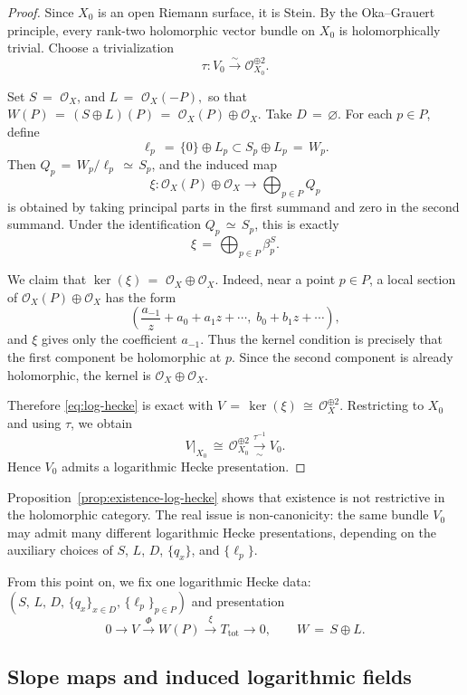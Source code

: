 \documentclass[a4paper,12pt]{amsart}
\numberwithin{equation}{section}
\theoremstyle{definition}
\newcommand{\OO}{\mathcal{O}}
\begin{document}
\begin{proof}
Since \(X_0\) is an open Riemann surface, it is Stein.  By the Oka--Grauert principle, every rank-two holomorphic vector bundle on \(X_0\) is holomorphically trivial.  Choose a trivialization
\[
\tau:V_0\xrightarrow{\sim}\OO_{X_0}^{\oplus 2}.
\]

Set
\(
S\,=\,\,\OO_X\), and  \(L\,=\,\,\OO_X(-P),
\)
so that
\(
W(P)\,=\,(S\oplus L)(P)\,=\,\,\OO_X(P)\oplus \OO_X.
\)
Take \(D\,=\,\varnothing\).  For each \(p\in P\), define
\[
\ell_p\,=\,\{0\}\oplus L_p\subset S_p\oplus L_p\,=\,W_p.
\]
Then \(Q_p\,=\,W_p/\ell_p\,\simeq\, S_p\), and the induced map
\[
\xi:\OO_X(P)\oplus \OO_X\longrightarrow \bigoplus_{p\in P}Q_p
\]
is obtained by taking principal parts in the first summand and zero in the second summand.  Under the identification \(Q_p\,\simeq\, S_p\), this is exactly
\[
\xi\,=\,\bigoplus_{p\in P}\beta_p^S.
\]

We claim that \(\ker(\xi)\,=\,\,\OO_X\oplus \OO_X\).  Indeed, near a point \(p\in P\), a local section of \(\OO_X(P)\oplus \OO_X\) has the form
\[
\left(\frac{a_{-1}}{z}+a_0+a_1z+\cdots,\; b_0+b_1z+\cdots\right),
\]
and \(\xi\) gives only the coefficient \(a_{-1}\).  Thus the kernel condition is precisely that the first component be holomorphic at \(p\).  Since the second component is already holomorphic, the kernel is \(\OO_X\oplus \OO_X\).

Therefore \eqref{eq:log-hecke} is exact with \(V\,=\,\ker(\xi)\,\cong\, \OO_X^{\oplus 2}\).  Restricting to \(X_0\) and using \(\tau\), we obtain
\[
V|_{X_0}\,\cong\, \OO_{X_0}^{\oplus 2}\xrightarrow[\sim]{\tau^{-1}} V_0.
\]
Hence \(V_0\) admits a logarithmic Hecke presentation.
\end{proof}

Proposition~\ref{prop:existence-log-hecke} shows that existence is not restrictive in the holomorphic category.  The real issue is non-canonicity: the same bundle \(V_0\) may admit many different logarithmic Hecke presentations, depending on the auxiliary choices of \(S\), \(L\), \(D\), \(\{q_x\}\), and \(\{\ell_p\}\).


From this point on, we fix one logarithmic Hecke data: $(S,\,L,\,D,\,\{q_x\}_{x\in D},\,\{\ell_p\}_{p\in P})$ and presentation
\[
0\longrightarrow V \xrightarrow{\ \Phi\ } W(P)\xrightarrow{\ \xi\ } T_{\mathrm{tot}}\longrightarrow 0,
\qquad W\,=\,S\oplus L.
\]

\subsection{Slope maps and induced logarithmic fields}
\end{document}
